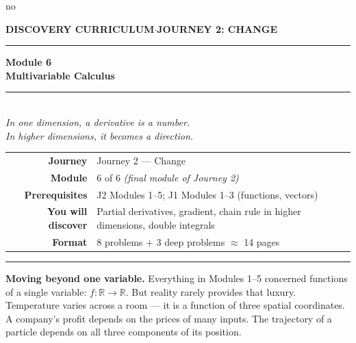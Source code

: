 \documentclass[12pt, a4paper]{article}
\newcounter{problem}
\begin{document}
no%

\thispagestyle{empty}
\begin{center}
{\small\color{MidBlue}\textbf{DISCOVERY CURRICULUM}\quad$\cdot$\quad\textbf{JOURNEY 2: CHANGE}}

\vspace{0.6cm}
{\color{NavyBlue}\rule{\linewidth}{2pt}}
\vspace{0.5cm}

{\Huge\bfseries\color{NavyBlue}Module 6}\\[0.3cm]
{\LARGE\bfseries\color{MidBlue}Multivariable Calculus}\\[0.4cm]
{\color{Gold}\rule{0.4\linewidth}{1.2pt}}\\[0.4cm]
{\large\itshape\color{DarkGrey}
In one dimension, a derivative is a number.\\[0.15cm]
In higher dimensions, it becomes a direction.}

\vspace{1cm}
\begin{tabular}{rl}
\color{DarkGrey}\textbf{Journey}           & Journey 2 --- Change \\[4pt]
\color{DarkGrey}\textbf{Module}            & 6 of 6 \textit{(final module of Journey 2)} \\[4pt]
\color{DarkGrey}\textbf{Prerequisites}     & J2 Modules 1--5; J1 Modules 1--3 (functions, vectors) \\[4pt]
\color{DarkGrey}\textbf{You will discover} & Partial derivatives, gradient, chain rule in higher dimensions, double integrals \\[4pt]
\color{DarkGrey}\textbf{Format}            & 8 problems $+$ 3 deep problems $\approx$ 14 pages \\
\end{tabular}

\vspace{1cm}
{\color{NavyBlue}\rule{\linewidth}{2pt}}
\end{center}

\vspace{0.5cm}

\noindent\textbf{Moving beyond one variable.}
Everything in Modules 1--5 concerned functions of a single variable: $f : \mathbb{R} \to \mathbb{R}$. But reality rarely provides that luxury. Temperature varies across a room --- it is a function of three spatial coordinates. A company's profit depends on the prices of many inputs. The trajectory of a particle depends on all three components of its position.
\end{document}
